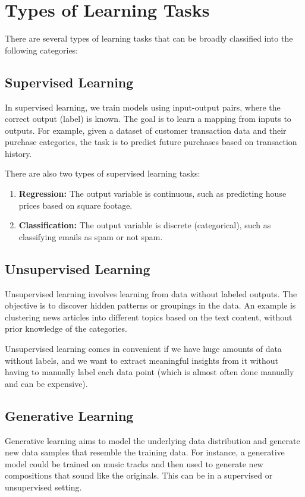 \section{Types of Learning Tasks}

There are several types of learning tasks that can be broadly classified into the following categories:

\subsection{Supervised Learning}
In supervised learning, we train models using input-output pairs, where the correct output (label) is known. The goal is to learn a mapping from inputs to outputs. For example, given a dataset of customer transaction data and their purchase categories, the task is to predict future purchases based on transaction history. \bigskip

There are also two types of supervised learning tasks:
\begin{enumerate}
    \item \textbf{Regression:} The output variable is continuous, such as predicting house prices based on square footage.
    \item \textbf{Classification:} The output variable is discrete (categorical), such as classifying emails as spam or not spam.
\end{enumerate}

\subsection{Unsupervised Learning}
Unsupervised learning involves learning from data without labeled outputs. The objective is to discover hidden patterns or groupings in the data. An example is clustering news articles into different topics based on the text content, without prior knowledge of the categories. \bigskip

Unsupervised learning comes in convenient if we have huge amounts of data without labels, and we want to extract meaningful insights from it without having to manually label each data point (which is almost often done manually and can be expensive).



\subsection{Generative Learning}
Generative learning aims to model the underlying data distribution and generate new data samples that resemble the training data. For instance, a generative model could be trained on music tracks and then used to generate new compositions that sound like the originals. This can be in a supervised or unsupervised setting.

